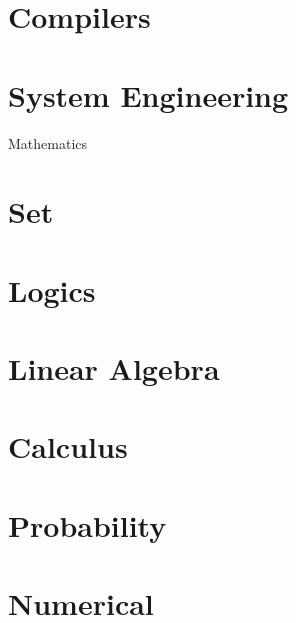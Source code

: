 \documentclass[11pt,journal,compsoc]{IEEEtran}
\begin{document}
\section{Compilers}


\section{System Engineering}


Mathematics


\section{Set}


\section{Logics}


\section{Linear Algebra}


\section{Calculus}


\section{Probability}


\section{Numerical}
\end{document}
